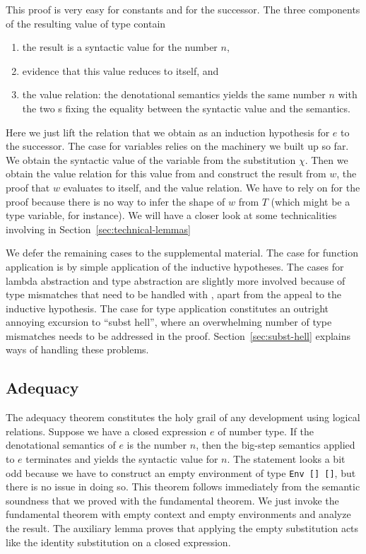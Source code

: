 \documentclass[acmsmall,anonymous,review,screen]{acmart}
\begin{document}
This proof is very easy for constants and for the successor.
\FundamentalFundamentalConstant
The three components of the resulting value of type {\AESem} contain
\begin{enumerate}
\item the result is a syntactic value for the number $n$,
\item evidence that this value reduces to itself, and
\item the value relation: the denotational semantics yields the same
  number $n$ with the two {\Arefl}s fixing the equality between the
  syntactic value and the semantics. 
\end{enumerate}
\FundamentalFundamentalSuccessor
Here we just lift the relation that we obtain as an induction
hypothesis for $e$ to the successor.
\FundamentalFundamentalVariable
The case for variables relies on the machinery we built up so
far. We obtain the syntactic value of the variable from the
substitution $\chi$. Then we obtain the value relation for this value
from {\AGSem} and construct the result from $w$, the proof that $w$
evaluates to itself, and the value relation. We have to rely on
{\AValueDown} for the proof because there is no way to infer the shape
of $w$ from $T$ (which might be a type variable, for instance).
We will have a closer look at some technicalities involving
{\AGLookup} in Section~\ref{sec:technical-lemmas}  

\FundamentalFundamentalLambda
\FundamentalFundamentalApplication

We defer the remaining cases to the supplemental material. The case
for function application is by simple application of the inductive
hypotheses.
The cases for lambda abstraction and type abstraction are slightly more involved because of
type mismatches that need to be handled with {\Asubst}, apart from the
appeal to the inductive hypothesis.
The case for type application constitutes an outright annoying
excursion to ``subst hell'', where an overwhelming number of type
mismatches needs to be addressed in the proof. Section~\ref{sec:subst-hell} explains
ways of handling these problems.

\subsection{Adequacy}
\label{sec:adequacy}

The adequacy theorem constitutes the holy grail of any development
using logical relations.
Suppose we have a closed expression $e$ of number type.
If the denotational semantics of $e$ is the number $n$, then the big-step
semantics applied to $e$ terminates and yields the syntactic value for
$n$.
The statement looks a bit odd because we have to construct an empty
environment of type \texttt{Env [] {\Anull} []}, but there is no issue in doing so.
\FundamentalAdequacyType
This theorem follows immediately from the semantic soundness that we proved with the
fundamental theorem.
\FundamentalAdequacyBody
We just invoke the fundamental theorem with empty context and empty
environments and analyze the result. The auxiliary lemma
{\ACsubClosed} proves that applying the empty substitution acts like
the identity substitution on a closed expression.
\FundamentalCsubClosed
\end{document}
